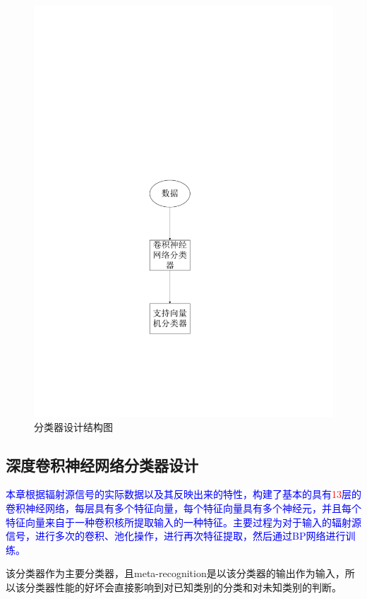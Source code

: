 \begin{figure}
	\centering
	\includegraphics[width=\textwidth]{figures/frame.pdf}
	\caption{分类器设计结构图}
\end{figure}


\subsection{深度卷积神经网络分类器设计}
\textcolor{blue}{本章根据辐射源信号的实际数据以及其反映出来的特性，构建了基本的具有\textcolor{red}{13}层的卷积神经网络，每层具有多个特征向量，每个特征向量具有多个神经元，并且每个特征向量来自于一种卷积核所提取输入的一种特征。主要过程为对于输入的辐射源信号，进行多次的卷积、池化操作，进行再次特征提取，然后通过BP网络进行训练。
}

该分类器作为主要分类器，且meta-recognition是以该分类器的输出作为输入，所以该分类器性能的好坏会直接影响到对已知类别的分类和对未知类别的判断。

